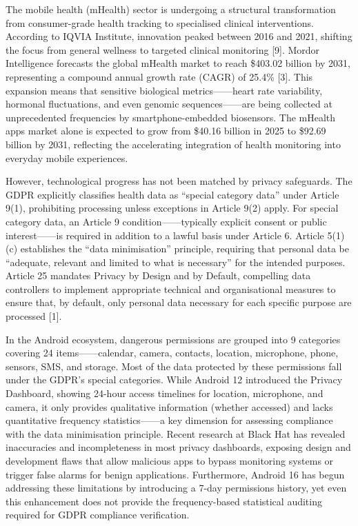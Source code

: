 The mobile health (mHealth) sector is undergoing a structural transformation from consumer-grade health tracking to specialised clinical interventions. According to IQVIA Institute, innovation peaked between 2016 and 2021, shifting the focus from general wellness to targeted clinical monitoring [9]. Mordor Intelligence forecasts the global mHealth market to reach \$403.02 billion by 2031, representing a compound annual growth rate (CAGR) of 25.4\% [3]. This expansion means that sensitive biological metrics——heart rate variability, hormonal fluctuations, and even genomic sequences——are being collected at unprecedented frequencies by smartphone-embedded biosensors. The mHealth apps market alone is expected to grow from \$40.16 billion in 2025 to \$92.69 billion by 2031, reflecting the accelerating integration of health monitoring into everyday mobile experiences.

However, technological progress has not been matched by privacy safeguards. The GDPR explicitly classifies health data as ``special category data'' under Article 9(1), prohibiting processing unless exceptions in Article 9(2) apply. For special category data, an Article 9 condition——typically explicit consent or public interest——is required in addition to a lawful basis under Article 6. Article 5(1)(c) establishes the ``data minimisation'' principle, requiring that personal data be ``adequate, relevant and limited to what is necessary'' for the intended purposes. Article 25 mandates Privacy by Design and by Default, compelling data controllers to implement appropriate technical and organisational measures to ensure that, by default, only personal data necessary for each specific purpose are processed [1].

In the Android ecosystem, dangerous permissions are grouped into 9 categories covering 24 items——calendar, camera, contacts, location, microphone, phone, sensors, SMS, and storage. Most of the data protected by these permissions fall under the GDPR's special categories. While Android 12 introduced the Privacy Dashboard, showing 24-hour access timelines for location, microphone, and camera, it only provides qualitative information (whether accessed) and lacks quantitative frequency statistics——a key dimension for assessing compliance with the data minimisation principle. Recent research at Black Hat has revealed inaccuracies and incompleteness in most privacy dashboards, exposing design and development flaws that allow malicious apps to bypass monitoring systems or trigger false alarms for benign applications. Furthermore, Android 16 has begun addressing these limitations by introducing a 7-day permissions history, yet even this enhancement does not provide the frequency-based statistical auditing required for GDPR compliance verification.

